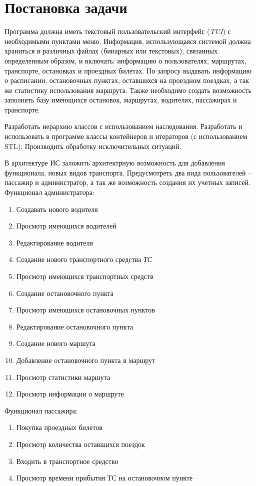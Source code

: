 \section{Постановка задачи}

Программа должна иметь текстовый пользовательский интерфейс (\textit{TUI}) с необходимыми пунктами меню. Информация, использующаяся системой должна храниться в различных файлах (бинарных или текстовых), связанных определенным образом, и включать: информацию о пользователях, маршрутах, транспорте, остановках и проездных билетах. По запросу выдавать информацию о расписании, остановочных пунктах, оставшихся на проездном поездках, а так же статистику использования маршрута. Также необходимо создать возможность заполнять базу имеющихся остановок, маршрутах, водителях, пассажирах и транспорте. 

Разработать иерархию классов с использованием наследования. Разработать и использовать в программе классы контейнеров и итераторов (с использованием STL). Производить обработку исключительных ситуаций. 

В архитектуре ИС заложить архитектрную возможность для добавления функционала, новых видов транспорта. Предусмотреть два вида пользователей -- пассажир и администратор, а так же возможность создания их учетных записей.
Функционал администратора:
\begin{enumerate}
    \item Создавать нового водителя
    \item Просмотр имеющихся водителей
    \item Редактирование водителя
    \item Создание нового транспортного средства \textit{ТС}
    \item Просмотр имеющихся транспортных средств
    \item Создание остановочного пункта
    \item Просмотр имеющихся остановочных пунктов
    \item Редактирование остановочного пункта
    \item Создание нового маршута
    \item Добавление остановочного пункта в маршрут
    \item Просмотр статистики маршута
    \item Просмотр информации о маршруте
\end{enumerate}

Функционал пассажира:
\begin{enumerate}
    \item Покупка проездных билетов
    \item Просмотр количества оставшихся поездок
    \item Входить в транспортное средство
    \item Просмотр времени прибытия ТС на остановочном пункте
\end{enumerate}
